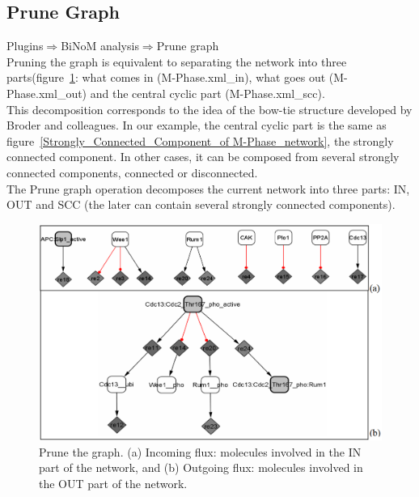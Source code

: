 \subsection{Prune Graph}
Plugins$\Rightarrow$BiNoM analysis$\Rightarrow$Prune graph\\
Pruning the graph is equivalent to separating the network into three parts(figure~\ref{Prune_the_graph}: what comes in (M-Phase.xml\_in), what goes out (M-Phase.xml\_out) and the central cyclic part (M-Phase.xml\_scc).
\\This decomposition corresponds to the idea of the bow-tie structure developed by Broder and colleagues\cite{broder2000graph}. In our example, the central cyclic part is the same as figure~\ref{Strongly_Connected_Component_of M-Phase_network}, the strongly connected component. In other cases, it can be composed from several strongly connected components, connected or disconnected.\\
The Prune graph operation decomposes the current network into three parts: IN, OUT and SCC (the later can contain several strongly connected components).
\begin{figure}
\centering
\includegraphics[width=14 cm]{graphics/Prune_the_graph}
\caption{Prune the graph. (a) Incoming flux: molecules involved in the IN part of the network, and (b) Outgoing flux: molecules involved in the OUT part of the network.}
\label{Prune_the_graph}
\end{figure}
